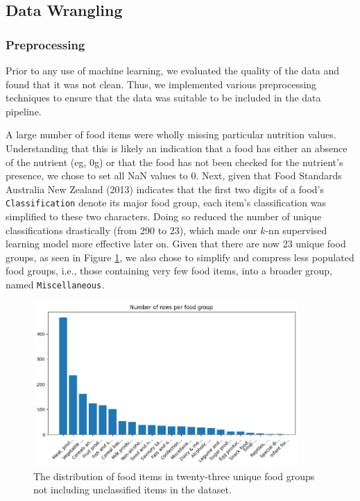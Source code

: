 \documentclass[11pt]{article}
\begin{document}
\subsection{Data Wrangling}

\subsubsection{Preprocessing}

Prior to any use of machine learning, we evaluated  the quality of the data and found that it was not clean. Thus, we implemented various preprocessing techniques to ensure that the data was suitable to be included in the data pipeline. 


A large number of food items were wholly missing particular nutrition values. Understanding that this is likely an indication that a food has either an absence of the nutrient (eg, 0g) or that the food has not been checked for the nutrient's presence, we chose to set all NaN values to 0. Next, given that Food Standards Australia New Zealand (2013) indicates that the first two digits of a food's \verb|Classification| denote its major food group, each item's classification was simplified to these two characters. Doing so reduced the number of unique classifications drastically (from 290 to 23), which made our $k$-nn supervised learning model more effective later on. Given that there are now 23 unique food groups, as seen in Figure \ref{fig:food-group-distribution}, we also chose to simplify and compress less populated food groups, i.e., those containing very few food items, into a broader group, named \verb|Miscellaneous|.

\begin{figure}[htbp]
    \centering
    \includegraphics[width=0.9\textwidth]{report/figs/number-of-rows-per-food-group.png}
    \caption{The distribution of food items in twenty-three unique food groups not including unclassified items in the \cite{FoodStandardsAustraliaNewZealand} dataset.}
    \label{fig:food-group-distribution}
\end{figure}
\end{document}
